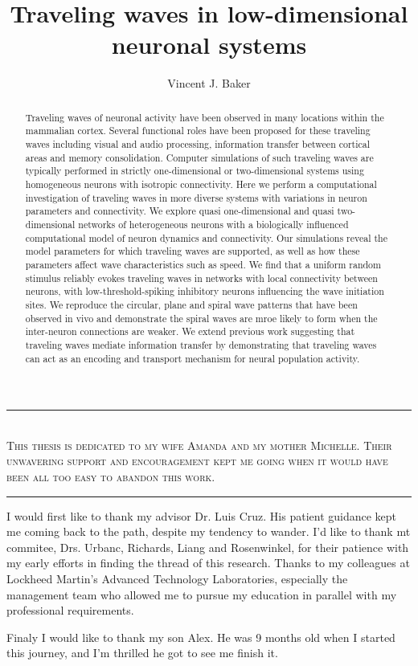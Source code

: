 \documentclass[subfig,blackref,approvalform]{drexel-thesis}
\author{Vincent J. Baker}
\title{Traveling waves in low-dimensional neuronal systems}
\begin{document}
\begin{DUTpreamble} %

\begin{dedications}
\rule{\textwidth}{1pt}
\\
\centering
\textsc{This thesis is dedicated to my wife Amanda and my mother Michelle.
Their unwavering support and encouragement kept me going when it would have been all too easy to abandon this work.}
\\
\rule{\textwidth}{1pt}
\end{dedications}


\begin{acknowledgments}
I would first like to thank my advisor Dr. Luis Cruz. 
His patient guidance kept me coming back to the path, despite my tendency to wander.
I'd like to thank mt commitee,  Drs. Urbanc, Richards, Liang and Rosenwinkel, for their patience with my early efforts in finding the thread of this research.
Thanks to my colleagues at Lockheed Martin's Advanced Technology Laboratories, especially the management team who allowed me to pursue my education in parallel with my professional requirements.

Finaly I would like to thank my son Alex. 
He was 9 months old when I started this journey, and I'm thrilled he got to see me finish it.
\end{acknowledgments}

\tableofcontents
\listoftables
\listoffigures

\begin{abstract}
Traveling waves of neuronal activity have been observed in many locations within the mammalian cortex.
Several functional roles have been proposed for these traveling waves including visual and audio processing, information transfer between cortical areas and memory consolidation.
Computer simulations of such traveling waves are typically performed in strictly one-dimensional or two-dimensional systems using homogeneous neurons with isotropic connectivity. 
Here we perform a computational investigation of traveling waves in more diverse systems with variations in neuron parameters and connectivity.
We explore quasi one-dimensional and quasi two-dimensional networks of heterogeneous neurons with a biologically influenced computational model of neuron dynamics and connectivity.
Our simulations reveal the model parameters for which traveling waves are supported, as well as how these parameters affect wave characteristics such as speed.
We find that a uniform random stimulus reliably evokes traveling waves in networks with local connectivity between neurons, with low-threshold-spiking inhibitory neurons influencing the wave initiation sites.
We reproduce the circular, plane and spiral wave patterns that have been observed in vivo and demonstrate the spiral waves are mroe likely to form when the inter-neuron connections are weaker.
We extend previous work suggesting that traveling waves mediate information transfer by demonstrating that traveling waves can act as an encoding and transport mechanism for neural population activity.

\end{abstract}
\end{DUTpreamble}
\end{document}
